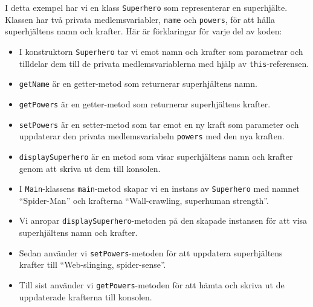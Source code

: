\begin{Shaded}
\begin{Highlighting}[]
\OperatorTok{();}

\OperatorTok{(}\OperatorTok{);}

\OperatorTok{(} \OperatorTok{+}\OperatorTok{());}
\OperatorTok{\}}
\OperatorTok{\}}
\end{Highlighting}
\end{Shaded}

I detta exempel har vi en klass \texttt{Superhero} som representerar en
superhjälte. Klassen har två privata medlemsvariabler, \texttt{name} och
\texttt{powers}, för att hålla superhjältens namn och krafter. Här är
förklaringar för varje del av koden:

\begin{itemize}
\tightlist
\item
  I konstruktorn \texttt{Superhero} tar vi emot namn och krafter som
  parametrar och tilldelar dem till de privata medlemsvariablerna med
  hjälp av \texttt{this}-referensen.
\item
  \texttt{getName} är en getter-metod som returnerar superhjältens namn.
\item
  \texttt{getPowers} är en getter-metod som returnerar superhjältens
  krafter.
\item
  \texttt{setPowers} är en setter-metod som tar emot en ny kraft som
  parameter och uppdaterar den privata medlemsvariabeln \texttt{powers}
  med den nya kraften.
\item
  \texttt{displaySuperhero} är en metod som visar superhjältens namn och
  krafter genom att skriva ut dem till konsolen.
\item
  I \texttt{Main}-klassens \texttt{main}-metod skapar vi en instans av
  \texttt{Superhero} med namnet ``Spider-Man'' och krafterna
  ``Wall-crawling, superhuman strength''.
\item
  Vi anropar \texttt{displaySuperhero}-metoden på den skapade instansen
  för att visa superhjältens namn och krafter.
\item
  Sedan använder vi \texttt{setPowers}-metoden för att uppdatera
  superhjältens krafter till ``Web-slinging, spider-sense''.
\item
  Till sist använder vi \texttt{getPowers}-metoden för att hämta och
  skriva ut de uppdaterade krafterna till konsolen.
\end{itemize}

